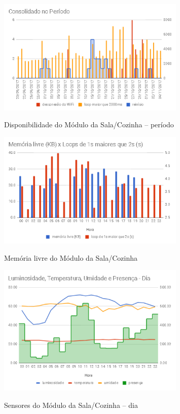 \begin{figure}[H]
	\centering
	\caption{Disponibilidade do Módulo da Sala/Cozinha -- período}
	\includegraphics[width=0.8\textwidth]{salacozinhadispperiodo}
	\label{fig:salacozinhadispperiodo}
\end{figure}

\begin{figure}[H]
	\centering
	\caption{Memória livre do Módulo da Sala/Cozinha}
	\includegraphics[width=0.8\textwidth]{memlivresalacozinha}
	\label{fig:memlivresalacozinha}
\end{figure}

\begin{figure}[H]
	\centering
	\caption{Sensores do Módulo da Sala/Cozinha -- dia}
	\includegraphics[width=0.8\textwidth]{sensoresdiasalacozinha}
	\label{fig:sensoresdiasalacozinha}
\end{figure}

